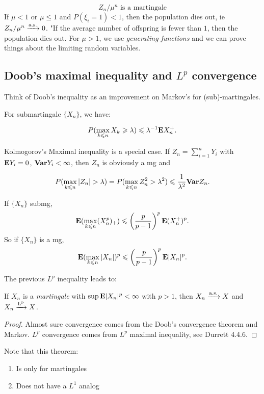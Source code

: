 \documentclass{article}
\begin{document}
$$\boxed{Z_n/\mu^n \text{ is a martingale}}$$
If $\mu < 1$ or $\mu \leq 1$ and $P(\xi_i =1)<1$, then the population dies out, ie $Z_n/\mu^n \xrightarrow{\mathrm{a.s.}} 0$. 
"If the average number of offspring is fewer than $1$, then the population dies out. For $\mu>1$, we use \textit{generating functions} and we can prove things about the limiting random variables. 

\subsection{Doob's maximal inequality and $L^p$ convergence}
Think of Doob's inequality as an improvement on Markov's for (sub)-martingales. 

\begin{theorem}
For submartingale $\{X_n\}$, we have:

$$P(\max_{k\leqslant n} X_k \geqslant \lambda) \leqslant \lambda^{-1} \mathbf{E} X_n^+.$$


\end{theorem}
Kolmogorov's Maximal inequality is a special case. If $Z_n = \sum_{i=1}^n Y_i$ with $\mathbf{E} Y_i = 0$, $\mathbf{Var} Y_i <\infty$, then $Z_n$ is obviously a mg and 

$$P(\max_{k\leqslant n} |Z_n| > \lambda) = P(\max_{k\leqslant n} Z_n^2 >\lambda^2) \leqslant \frac{1}{\lambda^2} \mathbf{Var} Z_n.$$

\begin{theorem}
If $\{X_n\}$ submg,
$$\mathbf{E}(\max_{k\leqslant n} (X_n^p)_+) \leqslant \left(\frac{p}{p-1}\right)^p \mathbf{E} (X_n^+)^p.$$
So if $\{X_n\}$ is a mg,
$$\mathbf{E}(\max_{k\leqslant n} |X_n|)^p \leqslant \left(\frac{p}{p-1}\right)^p \mathbf{E} |X_n|^p.$$
\end{theorem}

The previous $L^p$ inequality leads to:

\begin{theorem}
If $X_n$ is a \textit{martingale} with $\sup \mathbf{E}|X_n|^p <\infty$ with $p>1$, then $X_n\xrightarrow{\mathrm{a.s.}} X$ and $X_n\xrightarrow{\mathrm{L^p}} X$.
\begin{proof}
	Almost sure convergence comes from the Doob's convergence theorem and Markov. $L^p$ convergence comes from $L^p$ maximal inequality, see Durrett 4.4.6. 
\end{proof}
Note that this theorem:
\begin{enumerate}
	\item Is only for martingales
	\item Does not have a $L^1$ analog
\end{enumerate}
\end{theorem}
\end{document}
